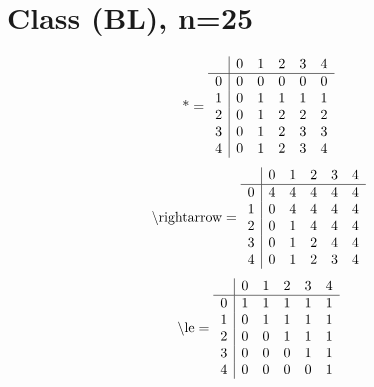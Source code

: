 \documentclass[11pt]{article}
\begin{document}
\section{Class (BL), n=25}
\[\text{*} = 
\begin{array}{r | r r r r r}
 & 0 & 1 & 2 & 3 & 4 \\ \hline
0 & 0 & 0 & 0 & 0 & 0 \\
1 & 0 & 1 & 1 & 1 & 1 \\
2 & 0 & 1 & 2 & 2 & 2 \\
3 & 0 & 1 & 2 & 3 & 3 \\
4 & 0 & 1 & 2 & 3 & 4 \\
\end{array}
\]
\[\text{\textbackslash rightarrow} = 
\begin{array}{r | r r r r r}
 & 0 & 1 & 2 & 3 & 4 \\ \hline
0 & 4 & 4 & 4 & 4 & 4 \\
1 & 0 & 4 & 4 & 4 & 4 \\
2 & 0 & 1 & 4 & 4 & 4 \\
3 & 0 & 1 & 2 & 4 & 4 \\
4 & 0 & 1 & 2 & 3 & 4 \\
\end{array}
\]
\[\text{\textbackslash le} = 
\begin{array}{r | r r r r r}
 & 0 & 1 & 2 & 3 & 4 \\ \hline
0 & 1 & 1 & 1 & 1 & 1 \\
1 & 0 & 1 & 1 & 1 & 1 \\
2 & 0 & 0 & 1 & 1 & 1 \\
3 & 0 & 0 & 0 & 1 & 1 \\
4 & 0 & 0 & 0 & 0 & 1 \\
\end{array}
\]
\end{document}
